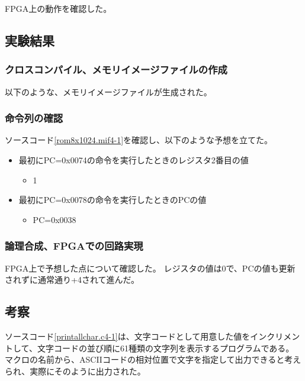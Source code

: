 FPGA上の動作を確認した。

\subsection{実験結果}
\subsubsection{クロスコンパイル、メモリイメージファイルの作成}
以下のような、メモリイメージファイルが生成された。


\subsubsection{命令列の確認}
ソースコード\ref{rom8x1024.mif4-1}を確認し、以下のような予想を立てた。
\begin{itemize}
  \item 最初にPC=0x0074の命令を実行したときのレジスタ2番目の値
  \begin{itemize}
    \item 1
  \end{itemize}
  \item 最初にPC=0x0078の命令を実行したときのPCの値
  \begin{itemize}
    \item PC=0x0038
  \end{itemize}
\end{itemize}

\subsubsection{論理合成、FPGAでの回路実現}
FPGA上で予想した点について確認した。
レジスタの値は0で、PCの値も更新されずに通常通り+4されて進んだ。

\subsection{考察}
ソースコード\ref{printallchar.c4-1}は、文字コードとして用意した値をインクリメントして、文字コードの並び順に61種類の文字列を表示するプログラムである。
マクロの名前から、ASCIIコードの相対位置で文字を指定して出力できると考えられ、実際にそのように出力された。

